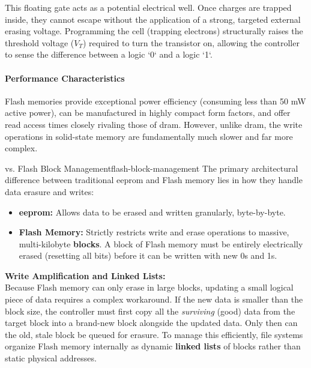 This floating gate acts as a potential electrical well. Once charges are trapped inside, they cannot escape without the application of a strong, targeted external erasing voltage. Programming the cell (trapping electrons) structurally raises the threshold voltage ($V_T$) required to turn the transistor on, allowing the controller to sense the difference between a logic `0` and a logic `1`.

\paragraph{Performance Characteristics}
Flash memories provide exceptional power efficiency (consuming less than 50 mW active power), can be manufactured in highly compact form factors, and offer read access times closely rivaling those of \gls{dram}. However, unlike \gls{dram}, the write operations in solid-state memory are fundamentally much slower and far more complex.

\begin{concept}{ vs. Flash Block Management}{flash-block-management}
    The primary architectural difference between traditional \gls{eeprom} and Flash memory lies in how they handle data erasure and writes:
    \begin{itemize}
        \item \textbf{\gls{eeprom}:} Allows data to be erased and written granularly, byte-by-byte.
        \item \textbf{Flash Memory:} Strictly restricts write and erase operations to massive, multi-kilobyte \textbf{blocks}. A block of Flash memory must be entirely electrically erased (resetting all bits) before it can be written with new 0s and 1s.
    \end{itemize}
    
    \noindent \textbf{Write Amplification and Linked Lists:}\\
    Because Flash memory can only erase in large blocks, updating a small logical piece of data requires a complex workaround. If the new data is smaller than the block size, the controller must first copy all the \textit{surviving} (good) data from the target block into a brand-new block alongside the updated data. Only then can the old, stale block be queued for erasure. To manage this efficiently, file systems organize Flash memory internally as dynamic \textbf{linked lists} of blocks rather than static physical addresses.
\end{concept}